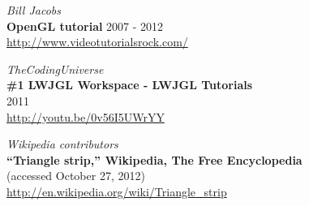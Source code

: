 \documentclass[11pt]{article}
\begin{document}
\begin{thebibliography}{3}
{\em Bill Jacobs} \\
{\bf OpenGL tutorial}
	2007 - 2012 \\
\url{http://www.videotutorialsrock.com/}

{\em TheCodingUniverse} \\
{\bf \#1 LWJGL Workspace - LWJGL Tutorials} \\
	2011 \\
\url{http://youtu.be/0v56I5UWrYY}

{\em Wikipedia contributors} \\
{\bf ``Triangle strip,'' Wikipedia, The Free Encyclopedia} \\
	(accessed October 27, 2012) \\
\url{http://en.wikipedia.org/wiki/Triangle_strip}


\end{thebibliography}
\end{document}

